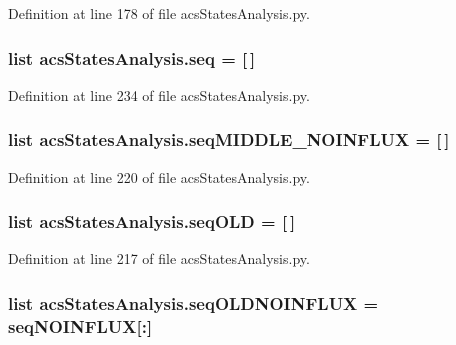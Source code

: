 Definition at line 178 of file acs\-States\-Analysis.\-py.

\hypertarget{a00098_a22eec19fcd0da474a136cfe97438ae3b}{
\subsubsection[{seq}]{\setlength{\rightskip}{0pt plus 5cm}list acs\-States\-Analysis.\-seq = \mbox{[}$\,$\mbox{]}}}\label{a00098_a22eec19fcd0da474a136cfe97438ae3b}


Definition at line 234 of file acs\-States\-Analysis.\-py.

\hypertarget{a00098_a8fd1a0445b2e641363a96da5a7e7159b}{
\subsubsection[{seq\-M\-I\-D\-D\-L\-E\-\_\-\-N\-O\-I\-N\-F\-L\-U\-X}]{\setlength{\rightskip}{0pt plus 5cm}list acs\-States\-Analysis.\-seq\-M\-I\-D\-D\-L\-E\-\_\-\-N\-O\-I\-N\-F\-L\-U\-X = \mbox{[}$\,$\mbox{]}}}\label{a00098_a8fd1a0445b2e641363a96da5a7e7159b}


Definition at line 220 of file acs\-States\-Analysis.\-py.

\hypertarget{a00098_a55e3b17fd716a4b1e28e7b9d93f1943c}{
\subsubsection[{seq\-O\-L\-D}]{\setlength{\rightskip}{0pt plus 5cm}list acs\-States\-Analysis.\-seq\-O\-L\-D = \mbox{[}$\,$\mbox{]}}}\label{a00098_a55e3b17fd716a4b1e28e7b9d93f1943c}


Definition at line 217 of file acs\-States\-Analysis.\-py.

\hypertarget{a00098_ac796dfff897c2b81d04e71e4f3306d16}{
\subsubsection[{seq\-O\-L\-D\-N\-O\-I\-N\-F\-L\-U\-X}]{\setlength{\rightskip}{0pt plus 5cm}list acs\-States\-Analysis.\-seq\-O\-L\-D\-N\-O\-I\-N\-F\-L\-U\-X = seq\-N\-O\-I\-N\-F\-L\-U\-X\mbox{[}\-:\mbox{]}}}\label{a00098_ac796dfff897c2b81d04e71e4f3306d16}


